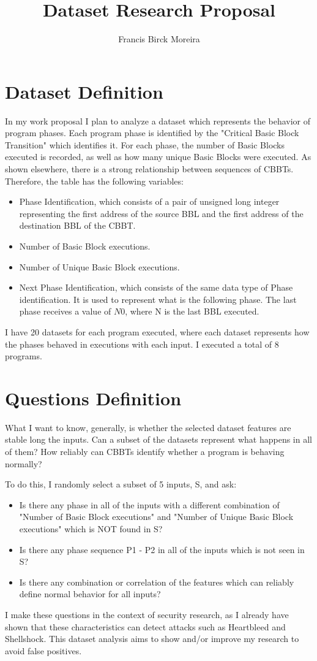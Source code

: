 \documentclass{article}
\begin{document}


\title{Dataset Research Proposal}
\author{Francis Birck Moreira}
\maketitle

\section{Dataset Definition}

In my work proposal I plan to analyze a dataset which represents the behavior of program phases.
Each program phase is identified by the "Critical Basic Block Transition" which identifies it.
For each phase, the number of Basic Blocks executed is recorded, as well as how many unique Basic Blocks were executed.
As shown elsewhere, there is a strong relationship between sequences of CBBTs.
Therefore, the table has the following variables: 

\begin{itemize}
\item Phase Identification, which consists of a pair of unsigned long integer representing the first address of the source BBL and the first address of the destination BBL of the CBBT.
\item Number of Basic Block executions.
\item Number of Unique Basic Block executions.
\item Next Phase Identification, which consists of the same data type of Phase identification. It is used to represent what is the following phase. The last phase receives a value of $N 0$, where N is the last BBL executed.
\end{itemize}

I have 20 datasets for each program executed, where each dataset represents how the phases behaved in executions with each input.
I executed a total of 8 programs.

\section{Questions Definition}

What I want to know, generally, is whether the selected dataset features are stable long the inputs.
Can a subset of the datasets represent what happens in all of them?
How reliably can CBBTs identify whether a program is behaving normally?

To do this, I randomly select a subset of 5 inputs, S, and ask:
\begin{itemize}
\item Is there any phase in all of the inputs with a different combination of "Number of Basic Block executions" and "Number of Unique Basic Block executions" which is NOT found in S?
\item Is there any phase sequence P1 - P2 in all of the inputs which is not seen in S?
\item Is there any combination or correlation of the features which can reliably define normal behavior for all inputs?
\end{itemize}

I make these questions in the context of security research, as I already have shown that these characteristics can detect attacks such as Heartbleed and Shellshock. This dataset analysis aims to show and/or improve my research to avoid false positives.
\end{document}

